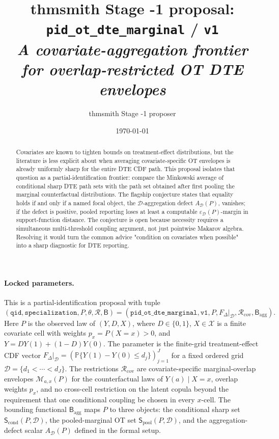 \documentclass[11pt]{article}
\title{thmsmith Stage -1 proposal: \texttt{pid\_ot\_dte\_marginal} / \texttt{v1}%
  \\ \large\textit{A covariate-aggregation frontier for overlap-restricted OT DTE envelopes}}
\author{thmsmith Stage -1 proposer}
\date{\today}
\renewcommand{\Pr}{\mathbb{P}}
\theoremstyle{definition}
\theoremstyle{plain}
\theoremstyle{remark}
\begin{document}
\maketitle


\paragraph{Locked parameters.}
This is a partial-identification proposal with tuple
\[
(\texttt{qid},\texttt{specialization},P,\theta,\mathcal R,\mathsf B)
=
(\texttt{pid\_ot\_dte\_marginal},\texttt{v1},P,F_\Delta|_{\mathcal D},
\mathcal R_{\mathrm{cov}},\mathsf B_{\mathrm{agg}}).
\]
Here \(P\) is the observed law of \((Y,D,X)\), where \(D\in\{0,1\}\), \(X\in\mathcal X\) is a finite covariate cell with weights \(p_x=P(X=x)>0\), and \(Y=DY(1)+(1-D)Y(0)\).  The parameter is the finite-grid treatment-effect CDF vector \(F_\Delta|_{\mathcal D}=(\Pr\{Y(1)-Y(0)\le d_j\})_{j=1}^J\) for a fixed ordered grid \(\mathcal D=\{d_1<\cdots<d_J\}\).  The restrictions \(\mathcal R_{\mathrm{cov}}\) are covariate-specific marginal-overlap envelopes \(\mathcal M_{a,x}(P)\) for the counterfactual laws of \(Y(a)\mid X=x\), overlap weights \(p_x\), and no cross-cell restriction on the latent copula beyond the requirement that one conditional coupling be chosen in every \(x\)-cell.  The bounding functional \(\mathsf B_{\mathrm{agg}}\) maps \(P\) to three objects: the conditional sharp set \(\mathsf S_{\mathrm{cond}}(P,\mathcal D)\), the pooled-marginal OT set \(\mathsf S_{\mathrm{pool}}(P,\mathcal D)\), and the aggregation-defect scalar \(A_{\mathcal D}(P)\) defined in the formal setup.

\begin{abstract}
Covariates are known to tighten bounds on treatment-effect distributions, but the literature is less explicit about when averaging covariate-specific OT envelopes is already uniformly sharp for the entire DTE CDF path.  This proposal isolates that question as a partial-identification frontier: compare the Minkowski average of conditional sharp DTE path sets with the path set obtained after first pooling the marginal counterfactual distributions.  The flagship conjecture states that equality holds if and only if a named focal object, the \(\mathcal D\)-aggregation defect \(A_{\mathcal D}(P)\), vanishes; if the defect is positive, pooled reporting loses at least a computable \(\varepsilon_{\mathcal D}(P)\)-margin in support-function distance.  The conjecture is open because necessity requires a simultaneous multi-threshold coupling argument, not just pointwise Makarov algebra.  Resolving it would turn the common advice "condition on covariates when possible" into a sharp diagnostic for DTE reporting.
\end{abstract}
\end{document}
